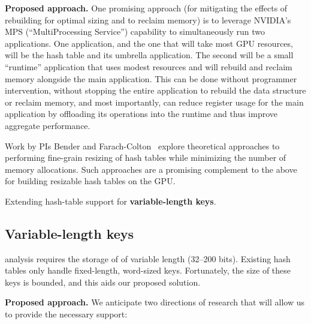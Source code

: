 \noindent\textbf{Proposed approach.}
One promising approach (for mitigating the effects of rebuilding for optimal sizing and to reclaim memory) is to leverage  NVIDIA's MPS (``MultiProcessing Service'') capability to simultaneously run two applications. One application, and the one that will take most GPU resources, will be the hash table and its umbrella application. The second will be a small ``runtime'' application that uses modest resources and will rebuild and reclaim memory alongside the main application. This can be done without programmer intervention, without stopping the entire application to rebuild the data structure or reclaim memory, and most importantly, can reduce register usage for the main application by offloading its operations into the runtime and thus improve aggregate performance.

Work by PIs Bender and Farach-Colton~\cite{iceberg,partitionhashing} explore theoretical approaches to performing fine-grain resizing of hash tables while minimizing the number of memory allocations.  Such approaches are a promising complement to the above for building resizable hash tables on the GPU.

\begin{rproblem}
  Extending hash-table support for \textbf{variable-length keys}.
  \label{rprob:variable-hashtable}
\end{rproblem}


\subsection{Variable-length keys}

\Kmer analysis requires the storage of \kmers of variable length (32--200 bits). Existing hash tables only handle fixed-length, word-sized keys. Fortunately, the size of these keys is bounded, and this aids our proposed solution.

\noindent
{\bf Proposed approach.}
We anticipate two directions of research that will allow us to provide the necessary support:

